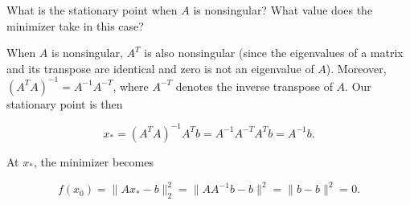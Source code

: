What is the stationary point when $A$ is nonsingular? What value does the minimizer take in this case?

\begin{solution}
  When $A$ is nonsingular, $A^T$ is also nonsingular (since the eigenvalues of a matrix and its transpose are 
  identical and zero is not an eigenvalue of $A$). Moreover, $\left( A^T A \right)^{-1} = A^{-1} A^{-T}$, where $A^{-T}$
  denotes the inverse transpose of $A$. Our stationary point is then

  $$
  x_* = \left(A^T A\right)^{-1} A^T b = A^{-1} A^{-T} A^T b = A^{-1} b.
  $$

  At $x_*$, the minimizer becomes

  $$
  f(x_0) = \lVert A x_* - b \rVert^2_2 = \lVert A A^{-1} b - b \rVert^2 = \lVert b - b \rVert^2 = 0.
  $$
\end{solution}